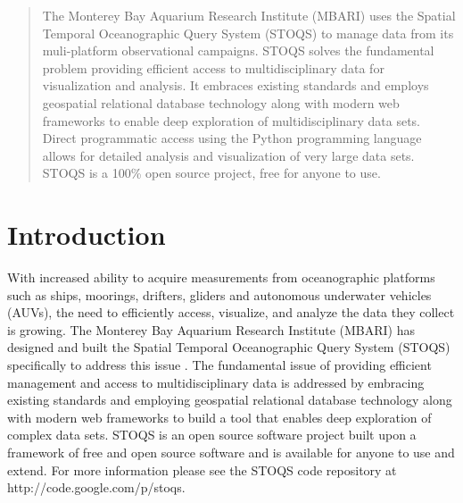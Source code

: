 \documentclass[conference]{IEEEtran}
\begin{document}
\begin{abstract}

The Monterey Bay Aquarium Research Institute (MBARI) uses the Spatial Temporal Oceanographic Query System (STOQS) to manage data from its muli-platform observational campaigns. STOQS solves the fundamental problem providing efficient access to multidisciplinary data for visualization and analysis. It embraces existing standards and employs geospatial relational database technology along with modern web frameworks to enable deep exploration of multidisciplinary data sets. Direct programmatic access using the Python programming language allows for detailed analysis and visualization of very large data sets. STOQS is a 100\% open source project, free for anyone to use.

\end{abstract}





%
\IEEEpeerreviewmaketitle


\section{Introduction}

With increased ability to acquire measurements from oceanographic platforms such as ships, moorings, drifters, gliders and autonomous underwater vehicles (AUVs), the need to efficiently access, visualize, and analyze the data they collect is growing. The Monterey Bay Aquarium Research Institute (MBARI) has designed and built the Spatial Temporal Oceanographic Query System (STOQS) specifically to address this issue \cite{imdis2013}. The fundamental issue of providing efficient management and access to multidisciplinary data is addressed by embracing existing standards and employing geospatial relational database technology along with modern web frameworks to build a tool that enables deep exploration of complex data sets. STOQS is an open source software project built upon a framework of free and open source software and is available for anyone to use and extend. For more information please see the STOQS code repository at http://code.google.com/p/stoqs.
\end{document}

